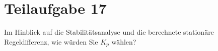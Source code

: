 \section{Teilaufgabe 17}
\begin{aufgabe}
Im Hinblick auf die Stabilitätsanalyse und die berechnete stationäre 
Regeldifferenz, wie würden Sie $K_p$ wählen?
\end{aufgabe}
